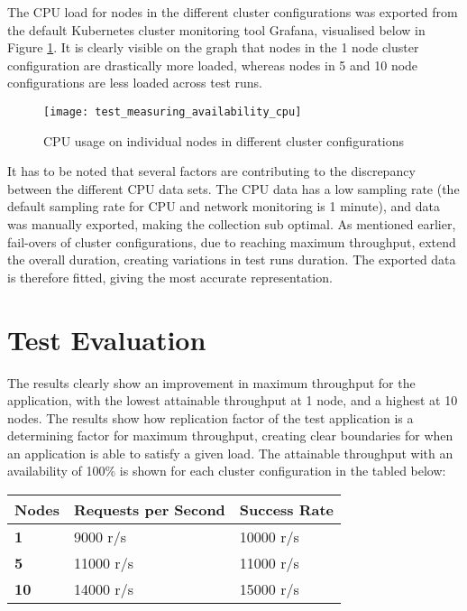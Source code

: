 The CPU load for nodes in the different cluster configurations was exported from the default Kubernetes cluster monitoring tool Grafana, visualised below in Figure \ref{fig:test_measuring_availability_cpu}. It is clearly visible on the graph that nodes in the 1 node cluster configuration are drastically more loaded, whereas nodes in 5 and 10 node configurations are less loaded across test runs.

\begin{figure}[!htb]
  \texttt{[image: test\_measuring\_availability\_cpu]}  
  \caption{CPU usage on individual nodes in different cluster configurations}
  \label{fig:test_measuring_availability_cpu}
\end{figure}

It has to be noted that several factors are contributing to the discrepancy between the different CPU data sets. The CPU data has a low sampling rate (the default sampling rate for CPU and network monitoring is 1 minute), and data was manually exported, making the collection sub optimal. As mentioned earlier, fail-overs of cluster configurations, due to reaching maximum throughput, extend the overall duration, creating variations in test runs duration. The exported data is therefore fitted, giving the most accurate representation.

\section{Test Evaluation}
The results clearly show an improvement in maximum throughput for the application, with the lowest attainable throughput at 1 node, and a highest at 10 nodes. The results show how replication factor of the test application is a determining factor for maximum throughput, creating clear boundaries for when an application is able to satisfy a given load. The attainable throughput with an availability of 100\% is shown for each cluster configuration in the tabled below:

\begin{center}
\begin{tabular}{ |p{2cm}|p{5cm}|p{5cm}|  }
 \hline
{\textbf{Nodes}} & {\textbf{Requests per Second}} & {\textbf{Success Rate}}\\
 \hline
 \textbf{1} & 9000 r/s & 10000 r/s\\
 \hline
 \textbf{5} & 11000 r/s & 11000 r/s\\ 
 \hline
 \textbf{10} & 14000 r/s & 15000 r/s\\ 
 \hline
\end{tabular}
\end{center}

